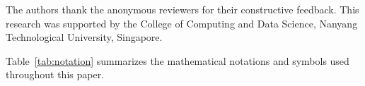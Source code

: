 \documentclass[final]{clv2025}
\begin{document}

\begin{acknowledgments}
The authors thank the anonymous reviewers for their constructive feedback. This research was supported by the College of Computing and Data Science, Nanyang Technological University, Singapore.
\end{acknowledgments}






\appendix

\label{sec:appendix_notation}

Table~\ref{tab:notation} summarizes the mathematical notations and symbols used throughout this paper.
\end{document}
